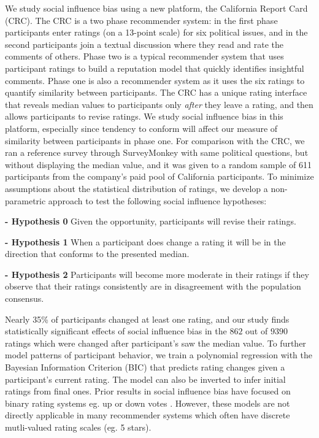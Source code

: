 We study social influence bias using a new platform, the California Report Card (CRC).
The CRC is a two phase recommender system: in the first phase participants enter ratings (on a 13-point scale) for six political issues, and in the second participants join a textual discussion where they read and rate the comments of others.
Phase two is a typical recommender system that uses participant ratings to build a reputation model that quickly identifies insightful comments.
Phase one is also a recommender system as it uses the six ratings to quantify similarity between participants.
The CRC has a unique rating interface that reveals median values to participants only \emph{after} they leave a rating, and then allows participants to revise ratings.
We study social influence bias in this platform, especially since tendency to conform will affect our measure of similarity between participants in phase one.
For comparison with the CRC, we ran a reference survey through SurveyMonkey with same political questions, but without displaying the median value, and it was given to a random sample of 611 participants from the company's paid pool of California participants.
To minimize assumptions about the statistical distribution of ratings, we develop a non-parametric approach to test the following social influence hypotheses:

\noindent \textbf{- Hypothesis 0} Given the opportunity, participants will revise their ratings.

\noindent \textbf{- Hypothesis 1} When a participant does change a rating it will be in the direction that conforms to the presented median.

\noindent \textbf{- Hypothesis 2} Participants will become more moderate in their ratings if they observe that their ratings consistently are in disagreement with the population consensus.

Nearly 35\% of participants changed at least one rating, and our study finds statistically significant effects of social influence bias in the $862$ out of $9390$ ratings which were changed after participant's saw the median value.
To further model patterns of participant behavior, we train a polynomial regression with the Bayesian Information Criterion (BIC) that predicts rating changes given a participant's current rating.
The model can also be inverted to infer initial ratings from final ones.
Prior results in social influence bias have focused on binary rating systems eg. up or down votes \cite{muchnik2013social, zhu2012switch}.
However, these models are not directly applicable in many recommender systems which often have discrete mutli-valued rating scales (eg. 5 stars).

